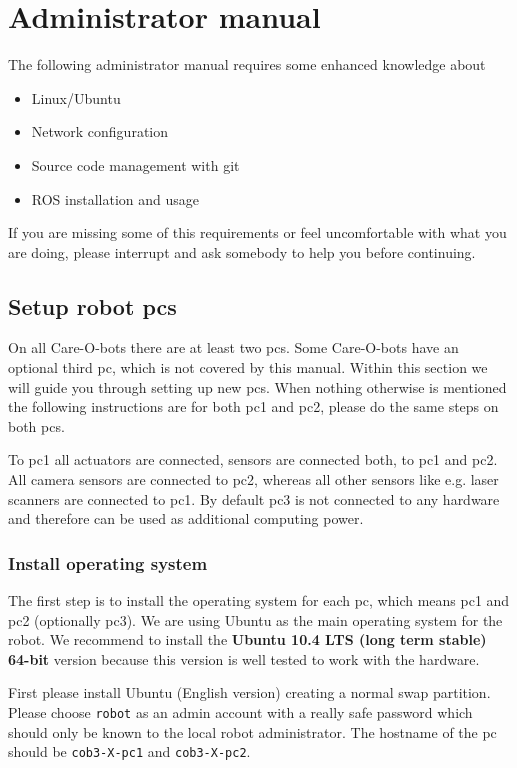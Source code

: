 \chapter{Administrator manual}
\label{chap:admin}

The following administrator manual requires some enhanced knowledge about
\begin{itemize}
\item Linux/Ubuntu
\item Network configuration
\item Source code management with git
\item ROS installation and usage
\end{itemize}
If you are missing some of this requirements or feel uncomfortable with what you are doing, please interrupt and ask somebody to help you before continuing.

\section{Setup robot pcs}
On all Care-O-bots there are at least two pcs. Some Care-O-bots have an optional third pc, which is not covered by this manual. Within this section we will guide you through setting up new pcs. When nothing otherwise is mentioned the following instructions are for both pc1 and pc2, please do the same steps on both pcs.

To pc1 all actuators are connected, sensors are connected both, to pc1 and pc2. All camera sensors are connected to pc2, whereas all other sensors like e.g. laser scanners are connected to pc1. By default pc3 is not connected to any hardware and therefore can be used as additional computing power.

\subsection{Install operating system}
The first step is to install the operating system for each pc, which means pc1 and pc2 (optionally pc3). We are using Ubuntu as the main operating system for the robot. We recommend to install the \textbf{Ubuntu 10.4 LTS (long term stable) 64-bit} version because this version is well tested to work with the hardware. 

First please install Ubuntu (English version) creating a normal swap partition. Please choose \texttt{robot} as an admin account with a really safe password which should only be known to the local robot administrator. The hostname of the pc should be \texttt{cob3-X-pc1} and \texttt{cob3-X-pc2}.

